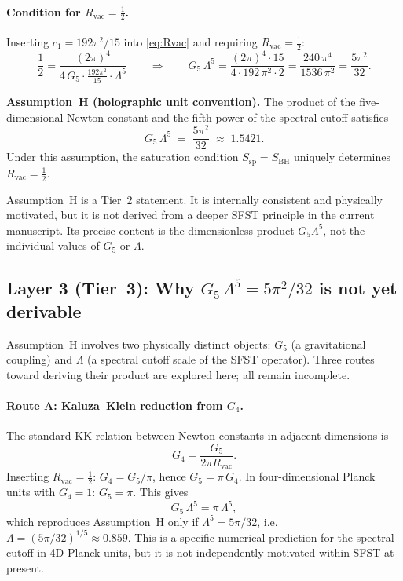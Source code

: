 \paragraph{Condition for $R_{\mathrm{vac}}=\tfrac{1}{2}$.}
Inserting $c_1=192\pi^2/15$ into \cref{eq:Rvac} and requiring
$R_{\mathrm{vac}}=\tfrac{1}{2}$:
\begin{equation}
  \label{eq:G5Lambda}
  \frac{1}{2} = \frac{(2\pi)^4}{4\,G_5 \cdot \tfrac{192\pi^2}{15}
                 \cdot \Lambda^5}
  \qquad\Longrightarrow\qquad
  G_5\,\Lambda^5 = \frac{(2\pi)^4\cdot 15}{4\cdot 192\,\pi^2\cdot 2}
               = \frac{240\,\pi^4}{1536\,\pi^2}
               = \frac{5\pi^2}{32}.
\end{equation}

\begin{tcolorbox}[colback=gray!8,colframe=black!40,title={\small
  Explicit residual assumption (Assumption~H)}]
\textbf{Assumption~H (holographic unit convention).}
The product of the five-dimensional Newton constant and the fifth power
of the spectral cutoff satisfies
\[
  G_5\,\Lambda^5 \;=\; \frac{5\pi^2}{32} \;\approx\; 1.5421.
\]
Under this assumption, the saturation condition
$S_{\mathrm{sp}}=S_{\mathrm{BH}}$ uniquely determines
$R_{\mathrm{vac}}=\tfrac{1}{2}$.
\end{tcolorbox}

Assumption~H is a Tier~2 statement.  It is internally consistent and
physically motivated, but it is not derived from a deeper SFST
principle in the current manuscript.  Its precise content is the
dimensionless product $G_5\Lambda^5$, not the individual values of
$G_5$ or $\Lambda$.

\subsection{Layer 3 (Tier~3): Why $G_5\,\Lambda^5 = 5\pi^2/32$
  is not yet derivable}
\label{ssec:G5open}

Assumption~H involves two physically distinct objects:
$G_5$ (a gravitational coupling) and $\Lambda$ (a spectral cutoff
scale of the SFST operator).  Three routes toward deriving their
product are explored here; all remain incomplete.

\paragraph{Route A: Kaluza--Klein reduction from $G_4$.}
The standard KK relation between Newton constants in adjacent
dimensions is
\[
  G_4 = \frac{G_5}{2\pi R_{\mathrm{vac}}}.
\]
Inserting $R_{\mathrm{vac}}=\tfrac{1}{2}$:
$G_4 = G_5/\pi$, hence $G_5 = \pi\,G_4$.
In four-dimensional Planck units with $G_4=1$:
$G_5 = \pi$.  This gives
\[
  G_5\,\Lambda^5 = \pi\,\Lambda^5,
\]
which reproduces Assumption~H only if $\Lambda^5=5\pi/32$, i.e.\
$\Lambda=(5\pi/32)^{1/5}\approx 0.859$.  This is a specific numerical
prediction for the spectral cutoff in 4D Planck units, but it is not
independently motivated within SFST at present.

